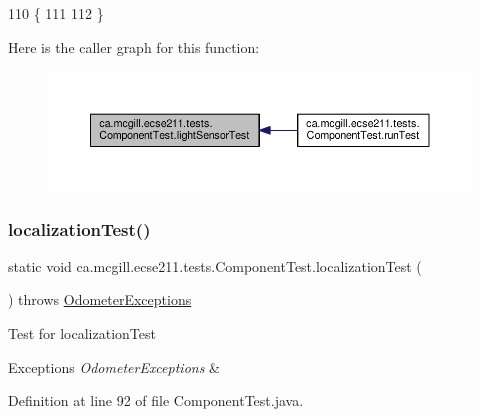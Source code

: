 \begin{DoxyCode}
110                                        \{
111 
112   \}
\end{DoxyCode}
Here is the caller graph for this function\+:\nopagebreak
\begin{figure}[H]
\begin{center}
\leavevmode
\includegraphics[width=350pt]{enumca_1_1mcgill_1_1ecse211_1_1tests_1_1_component_test_a3e8288f482b3806a0f3c4668951f3e36_icgraph}
\end{center}
\end{figure}
\mbox{\label{enumca_1_1mcgill_1_1ecse211_1_1tests_1_1_component_test_ad11712dd74c5c64e84cd71186a59a087}} 
\subsubsection{\texorpdfstring{localization\+Test()}{localizationTest()}}
{\footnotesize\ttfamily static void ca.\+mcgill.\+ecse211.\+tests.\+Component\+Test.\+localization\+Test (\begin{DoxyParamCaption}{ }\end{DoxyParamCaption}) throws \hyperlink{classca_1_1mcgill_1_1ecse211_1_1odometer_1_1_odometer_exceptions}{Odometer\+Exceptions}\hspace{0.3cm}{\ttfamily [static]}}

Test for localization\+Test


\begin{DoxyExceptions}{Exceptions}
{\em Odometer\+Exceptions} & \\
\hline
\end{DoxyExceptions}


Definition at line 92 of file Component\+Test.\+java.


